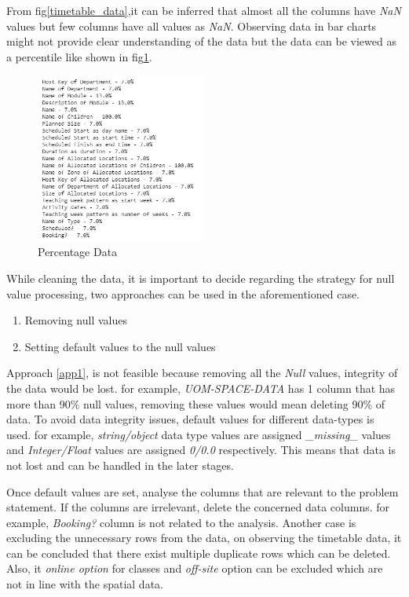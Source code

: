 From fig\ref{timetable_data},it can be inferred that almost all the columns have \textit{NaN} values but few columns have all values as \textit{NaN}. Observing data in bar charts might not provide clear understanding of the data but the data can be viewed as a percentile like shown in fig\ref{Percentage_data}.

\begin{figure}[H]
    \centering
    \includegraphics[width=0.5\textwidth]{resources/images/percentage data.PNG}
    \caption{Percentage Data}
    \label{Percentage_data}
\end{figure}

While cleaning the data, it is important to decide regarding the strategy for null value processing, two approaches can be used in the aforementioned case.
\begin{enumerate}
	\item Removing null values \label{app1}
	\item Setting default values to the null values\label{app2}
\end{enumerate}

Approach \ref{app1}, is not feasible because removing all the \textit{Null} values, integrity of the data would be lost.
for example, \textit{UOM-SPACE-DATA} has 1 column that has more than 90\% null values, removing these values would mean deleting 90\% of data.  To avoid data integrity issues, default values for different data-types is used. for example, \textit{string/object} data type values are assigned \textit{\_missing\_} values and \textit{Integer/Float} values are assigned \textit{0/0.0} respectively.
This means that data is not lost and can be handled in the later stages.

Once default values are set, analyse the columns that are relevant to the problem statement. If the columns are irrelevant, delete the concerned data columns. for example, \textit{Booking?} column is not related to the analysis.
Another case is excluding the unnecessary rows from the data, on observing the timetable data, it can be concluded that there exist multiple duplicate rows which can be deleted. Also, it \textit{online option} for classes and \textit{off-site} option can be excluded which are not in line with the spatial data.

